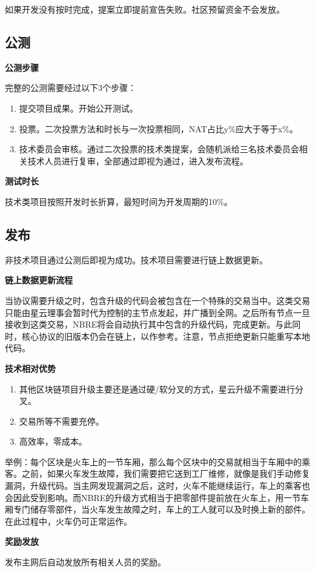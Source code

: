 如果开发没有按时完成，提案立即提前宣告失败。社区预留资金不会发放。

\subsection{公测}
\textbf{公测步骤}

完整的公测需要经过以下3个步骤：
\begin{enumerate}
\item 提交项目成果。开始公开测试。
\item 投票。二次投票方法和时长与一次投票相同，NAT占比y\%应大于等于x\%。
\item 技术委员会审核。通过二次投票的技术类提案，会随机派给三名技术委员会相关技术人员进行复审，全部通过即视为通过，进入发布流程。
\end{enumerate}

\textbf{测试时长}

技术类项目按照开发时长折算，最短时间为开发周期的10\%。

\subsection{发布}
非技术项目通过公测后即视为成功。技术项目需要进行链上数据更新。

\textbf{链上数据更新流程}

当协议需要升级之时，包含升级的代码会被包含在一个特殊的交易当中。这类交易只能由星云理事会暂时代为控制的主节点发起，并广播到全网。之后所有节点一旦接收到这类交易，NBRE将会自动执行其中包含的升级代码，完成更新。与此同时，核心协议的旧版本仍会在链上，以作参考。注意，节点拒绝更新只能重写本地代码。

\textbf{技术相对优势}
\begin{enumerate}
	\item 其他区块链项目升级主要还是通过硬/软分叉的方式，星云升级不需要进行分叉。
\item 交易所等不需要充停。
\item 高效率，零成本。
\end{enumerate}

举例：每个区块是火车上的一节车厢，那么每个区块中的交易就相当于车厢中的乘客。之前，如果火车发生故障，我们需要把它送到工厂维修，就像是我们手动修复漏洞，升级代码。当主网发现漏洞之后，这时，火车不能继续运行，车上的乘客也会因此受到影响。而NBRE的升级方式相当于把零部件提前放在火车上，用一节车厢专门储存零部件，当火车发生故障之时，车上的工人就可以及时换上新的部件。在此过程中，火车仍可正常运作。

\textbf{奖励发放}

发布主网后自动发放所有相关人员的奖励。

